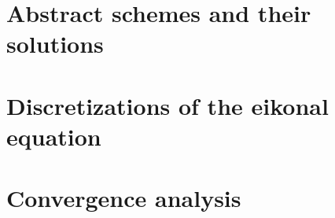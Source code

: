 \documentclass[11pt]{article}
\begin{document}
\section{Abstract schemes and their solutions}
\label{sec:abstract}


\section{Discretizations of the eikonal equation}
\label{sec:discretization}


\section{Convergence analysis}
\label{sec:convergence}





\end{document}
